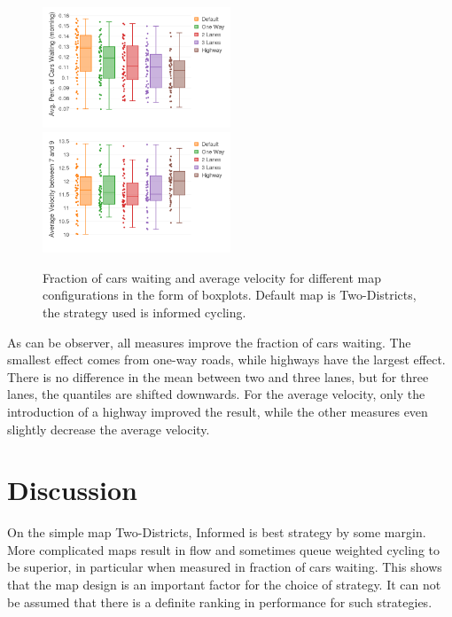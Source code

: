 \documentclass[11pt]{article}
\begin{document}
\begin{figure}[t]
	\includegraphics[width=0.5\textwidth]{img/urban_planning_frac.png}
	\includegraphics[width=0.5\textwidth]{img/urban_planning_velo.png}
	\caption{Fraction of cars waiting and average velocity for different map configurations in the form of boxplots. Default map is Two-Districts, the strategy used is informed cycling. \label{fig:urban-planning-stats}}
\end{figure}

As can be observer, all measures improve the fraction of cars waiting. The smallest effect comes from one-way roads, while highways have the largest effect. There is no difference in the mean between two and three lanes, but for three lanes, the quantiles are shifted downwards. For the average velocity, only the introduction of a highway improved the result, while the other measures even slightly decrease the average velocity.

\section{Discussion}
\label{sec:discussion}

On the simple map Two-Districts, Informed is best strategy by some margin. More complicated maps result in flow and sometimes queue weighted cycling to be superior, in particular when measured in fraction of cars waiting. This shows that the map design is an important factor for the choice of strategy. It can not be assumed that there is a definite ranking in performance for such strategies.
\end{document}
